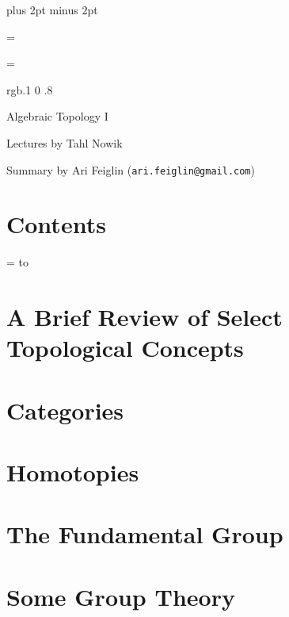 

\parindent=0pt
\parskip=3pt plus 2pt minus 2pt



\def\printmcount{\the\counter{section}.\the\counter{math counter}}

\footline={}


\headline={}

\color rgb{.1 0 .8}

{\def\boxshadowcolor{rgb{.3 .3 .8}}

    \centerline{Algebraic Topology I}
    \smallskip
    \centerline{Lectures by Tahl Nowik}
    \centerline{Summary by Ari Feiglin ({\tt ari.feiglin@gmail.com})}

\eppbox

\bigskip

    \section*{Contents}
    
    \tableofcontents
\eppbox

}

\vfill\break

\color{black}

\newif\ifpageodd
\pageoddtrue
\headline={%
    \hbox to \hsize{\color{black}%
        \ifpageodd\hfil{\it\currsubsection\quad\bf\folio}\global\pageoddfalse%
        \else{\bf\folio\quad\it\currsubsection}\hfil\global\pageoddtrue\fi%
    }%
}

\section{A Brief Review of Select Topological Concepts}



\vfill\break

\section{Categories}



\vfill\break

\section{Homotopies}



\vfill\break

\section{The Fundamental Group}




\vfill\break

\section{Some Group Theory}


\bye

